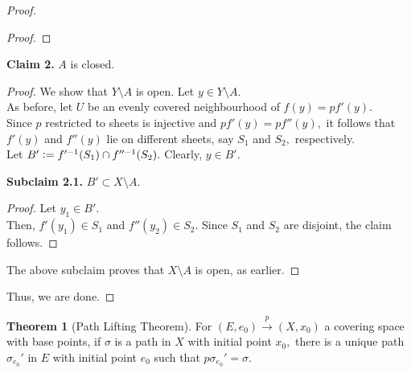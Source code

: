 \documentclass[12pt]{article}
\theoremstyle{definition}
\newtheorem{thm}{Theorem}
\numberwithin{thm}{section}
\newenvironment{blockquote}
{\begin{mdframed}[skipabove=0pt, skipbelow=0pt, innertopmargin=4pt, innerbottommargin=4pt, bottomline=false,topline=false,rightline=false, linewidth=2pt]}
{\end{mdframed}}
\begin{document}
\begin{proof}
\begin{blockquote}
\begin{proof}
		\end{proof}
	\end{blockquote}
	\begin{blockquote}
		\textbf{Claim 2.} $A$ is closed.
		\begin{proof} 
			We show that $Y\setminus A$ is open. Let $y \in Y\setminus A.$\\
			As before, let $U$ be an evenly covered neighbourhood of $f(y) = pf'(y).$\\
			Since $p$ restricted to sheets is injective and $pf'(y) = pf''(y),$ it follows that $f'(y)$ and $f''(y)$ lie on different sheets, say $S_1$ and $S_2,$ respectively.\\
			Let $B' \vcentcolon= f'^{-1}(S_1) \cap f''^{-1}(S_2).$ Clearly, $y \in B'.$\\
			\begin{blockquote}
				\textbf{Subclaim 2.1.} $B' \subset X\setminus A.$
				\begin{proof} 
					Let $y_1 \in B'.$ \\
					Then, $f'(y_1) \in S_1$ and $f''(y_2) \in S_2.$ Since $S_1$ and $S_2$ are disjoint, the claim follows.
				\end{proof}
			\end{blockquote}
			The above subclaim proves that $X\setminus A$ is open, as earlier.
		\end{proof}
	\end{blockquote}
	Thus, we are done.
\end{proof}
\begin{thm}[Path Lifting Theorem] 
	For $(E, e_0) \overset{p}{\longrightarrow} (X, x_0)$ a covering space with base points, if $\sigma$ is a path in $X$ with initial point $x_0,$ there is a unique path $\sigma_{e_0}'$ in $E$ with initial point $e_0$ such that $p\sigma_{e_0}' = \sigma.$
\end{thm}
\end{document}
